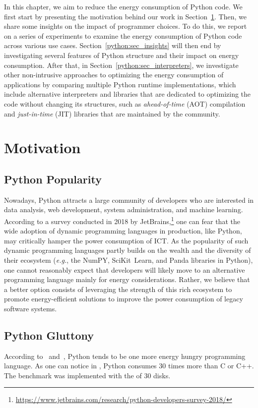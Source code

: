 In this chapter, we aim to reduce the energy consumption of Python code.
We first start by presenting the motivation behind our work in Section~\ref{python:sec_motivation}.
Then, we share some insights on the impact of programmer choices.
To do this, we report on a series of experiments to examine the energy consumption of Python code across various use cases.
Section~\ref{python:sec_insights} will then end by investigating several features of Python structure and their impact on energy consumption.
After that, in Section~\ref{python:sec_interpreters}, we investigate other non-intrusive approaches to optimizing the energy consumption of applications by comparing multiple Python runtime implementations, which include alternative interpreters and libraries that are dedicated to optimizing the code without changing its structures, such as \emph{ahead-of-time} (AOT) compilation and \emph{just-in-time} (JIT) libraries that are maintained by the community.


\section{Motivation}\label{python:sec_motivation}

\subsection{Python Popularity}
Nowadays, Python attracts a large community of developers who are interested in data analysis, web development, system administration, and machine learning.
According to a survey conducted in 2018 by JetBrains,\footnote{\url{https://www.jetbrains.com/research/python-developers-survey-2018/}} one can fear that the wide adoption of dynamic programming languages in production, like Python, may critically hamper the power consumption of ICT.
As the popularity of such dynamic programming languages partly builds on the wealth and the diversity of their ecosystem (\emph{e.g.}, the NumPY, SciKit\, Learn, and Panda libraries in Python), one cannot reasonably expect that developers will likely move to an alternative programming language mainly for energy considerations.
Rather, we believe that a better option consists of leveraging the strength of this rich ecosystem to promote energy-efficient solutions to improve the power consumption of legacy software systems.

\subsection{Python Gluttony}
According to~\cite{pinto_energy_2017} and~\cite{noureddine_preliminary_2012}, Python tends to be one more energy hungry programming language.
As one can notice in , Python consumes $30$ times more than C or C++.
The benchmark was implemented with the  of 30 disks.

